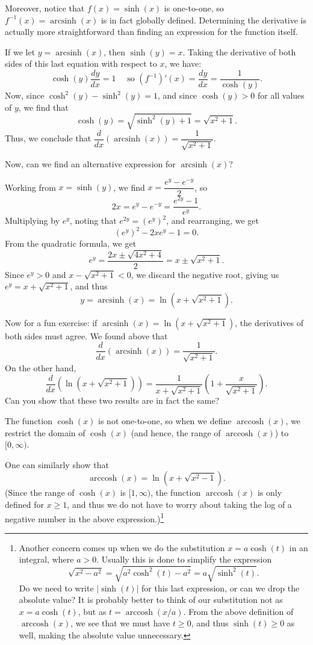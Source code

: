 \documentclass[12pt,letterpaper]{article}
\DeclareMathOperator{\arcsinh}{arcsinh}
\DeclareMathOperator{\arccosh}{arccosh}
\begin{document}
Moreover, notice that $f(x) = \sinh(x)$ is one-to-one, so $f^{-1}(x) = \arcsinh(x)$ is in fact globally defined. Determining the derivative is actually more straightforward than finding an expression for the function itself.

If we let $y=\arcsinh(x)$, then $\sinh(y) = x$. Taking the derivative of both sides of this last equation with respect to $x$, we have:
\[
\cosh(y)\frac{dy}{dx} = 1 \quad \text{ so } (f^{-1})'(x) = \frac{dy}{dx} = \frac{1}{\cosh(y)}.
\]
Now, since $\cosh^2(y)-\sinh^2(y)=1$, and since $\cosh(y)>0$ for all values of $y$, we find that
\[
\cosh(y) = \sqrt{\sinh^2(y)+1} = \sqrt{x^2+1}.
\]
Thus, we conclude that $\dfrac{d}{dx}(\arcsinh(x)) = \dfrac{1}{\sqrt{x^2+1}}$.

Now, can we find an alternative expression for $\arcsinh(x)$?

Working from $x=\sinh(y)$, we find $x= \dfrac{e^{y}-e^{-y}}{2}$, so
\[
2x = e^y-e^{-y} = \frac{e^{2y}-1}{e^y}.
\]
Multiplying by $e^y$, noting that $e^{2y} = (e^y)^2$, and rearranging, we get
\[
(e^y)^2-2xe^y-1=0.
\]
From the quadratic formula, we get
\[
e^y = \frac{2x\pm\sqrt{4x^2+4}}{2} = x\pm\sqrt{x^2+1}.
\]
Since $e^y>0$ and $x-\sqrt{x^2+1}<0$, we discard the negative root, giving us $e^y = x+\sqrt{x^2+1}$, and thus
\[
y = \arcsinh(x) = \ln(x+\sqrt{x^2+1}).
\]

Now for a fun exercise: if $\arcsinh(x) = \ln(x+\sqrt{x^2+1})$, the derivatives of both sides must agree. We found above that
\[
\frac{d}{dx}(\arcsinh(x)) = \frac{1}{\sqrt{x^2+1}}.
\]
On the other hand,
\[
\frac{d}{dx}(\ln(x+\sqrt{x^2+1})) = \frac{1}{x+\sqrt{x^2+1}}\left(1+\frac{x}{\sqrt{x^2+1}}\right).
\]
Can you show that these two results are in fact the same?

The function $\cosh(x)$ is not one-to-one, so when we define $\arccosh(x)$, we restrict the domain of $\cosh(x)$ (and hence, the range of $\arccosh(x)$) to $[0,\infty)$.

One can similarly show that
\[
\arccosh(x) = \ln(x + \sqrt{x^2-1}).
\]
(Since the range of $\cosh(x)$ is $[1,\infty)$, the function $\arccosh(x)$ is only defined for $x\geq 1$, and thus we do not have to worry about taking the log of a negative number in the above expression.)\footnote{Another concern comes up when we do the substitution $x=a\cosh(t)$ in an integral, where $a>0$. Usually this is done to simplify the expression
\[
\sqrt{x^2-a^2} = \sqrt{a^2\cosh^2(t)-a^2} = a\sqrt{\sinh^2(t)}.
\]
Do we need to write $\lvert\sinh(t)\rvert$ for this last expression, or can we drop the absolute value? It is probably better to think of our substitution not as $x=a\cosh(t)$, but as $t=\arccosh(x/a)$. From the above definition of $\arccosh(x)$, we see that we must have $t\geq 0$, and thus $\sinh(t)\geq 0$ as well, making the absolute value unnecessary.}
\end{document}
